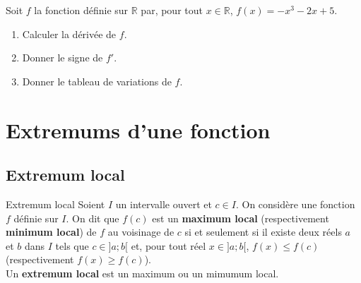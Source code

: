 \documentclass[11pt]{article}
\begin{document}
\begin{app}
  Soit $f$ la fonction définie sur $\mathbb{R}$ par, pour tout $x\in\mathbb{R}$, $f(x)=-x^3-2x+5$.
  \begin{enumerate}
    \item Calculer la dérivée de $f$.
    \item Donner le signe de $f'$.
    \item Donner le tableau de variations de $f$.
  \end{enumerate}
\end{app}

\section{Extremums d'une fonction}
\subsection{Extremum local}
\begin{defi}{Extremum local}
  Soient $I$ un intervalle ouvert et $c\in I$. On considère une fonction $f$
  définie sur $I$. On dit que $f(c)$ est un \textbf{maximum local} (respectivement
  \textbf{minimum local}) de $f$ au voisinage de $c$ si et seulement si il
existe deux réels $a$ et $b$ dans $I$ tels que $c\in]a;b[$ et, pour tout réel
$x\in]a;b[$, $f(x)\leq f(c)$ (respectivement $f(x)\geq f(c)$).\\
  Un \textbf{extremum local} est un maximum ou un mimumum local.
\end{defi}
\end{document}
